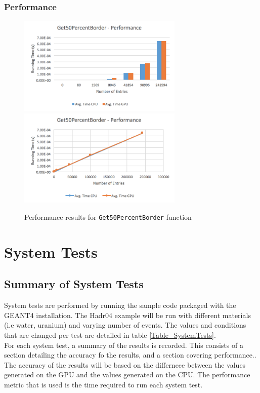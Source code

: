 \documentclass[12pt]{article}
\begin{document}
	\subsubsection{Performance}
		\begin{figure}[H]
    	\centering
    	\caption{Performance results for \texttt{Get50PercentBorder} function}\label{figPerformanceGet50Percent}
    	\includegraphics[width=0.7\textwidth]{get50_bar.png}
    	\includegraphics[width=0.7\textwidth]{get50_line.png}
    	\end{figure}
		
\section{System Tests}
\subsection{Summary of System Tests}
System tests are performed by running the sample code packaged with the GEANT4 installation. The Hadr04 example will be run with different materials (i.e water, uranium) and varying number of events. The values and conditions that are changed per test are detailed in table \ref{Table_SystemTests}.\\

For each system test, a summary of the results is recorded. This consists of a section detailing the accuracy fo the results, and a section covering performance.. The accuracy of the results will be based on the differnece between the values generated on the GPU and the values generated on the CPU. The performance metric that is used is the time required to run each system test.
\end{document}
